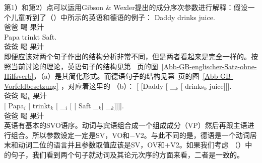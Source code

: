 第1）和第2）点可以运用Gibson \& Wexler提出的成分序次参数进行解释：假设一个儿童听到了（）中所示的英语和德语的例子：
\eal
\ex 
\gll Daddy drinks juice.\\  
    爸爸 喝 果汁\\
\ex 
\gll Papa trinkt Saft.\\
     爸爸 喝 果汁\\
\zl
即便应该对两个句子作出的结构分析非常不同，但是两者看起来是完全一样的。按照当前讨论的理论，英语句子的结构见第~\pageref{Abb-GB-englischer-Satz-ohne-Hilfsverb} 页的图~\ref{Abb-GB-englischer-Satz-ohne-Hilfsverb}，（a）是其简化形式。而德语句子的结构见第~\pageref{Abb-GB-Vorfeldbesetzung}页的图~\ref{Abb-GB-Vorfeldbesetzung} ，对应着这里的 （b）：
\eal
\ex 
\gll {}[ [Daddy [ \_$_k$ [ drinks$_k$ juice]]].\\  
       {}        \spacebr{}爸爸 \spacebr{} {} {} 喝$_k$ 果汁\\
\ex 
\gll {}[ Papa$_i$ [ trinkt$_k$ [ \_$_i$ [ [ Saft \_$_k$] \_$_k$]]]].\\  
   {} 爸爸 {} 喝 {} {} {} {} 果汁\\
\zl
英语有基本的SVO语序。动词与宾语组合成一个组成成分（VP）然后再跟主语进行组合。所以参数设定一定是SV，VO和$-$V2。与此不同的是，德语是一个动词居末和动词二位的语言并且参数取值应该是SV，OV和$+$V2。如果我们考虑 （）中的句子，我们看到两个句子就动词及其论元次序的方面来看，二者是一致的。

